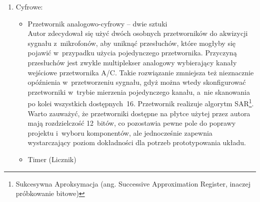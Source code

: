 \begin{enumerate}
\begin{itemize}
\begin{figure}[h!]
			\caption{Użyty w~projekcie głośnik.\\ Źródło: https://botland.com.pl/49567-thickbox\_default/glosnik-mg15-01w-8ohm-15x4mm.jpg}
			\label{fig:mg15}
		\end{figure}
		\item Filtr dolnoprzepustowy (antyaliasingowy) -- dwie sztuki\\
		Zanim sygnał zostanie dostarczony do przetwornika A/C, należy zapewnić, by jego częstotliwość nie przekroczyła częstotliwości Nyquista\footnote{Jest to połowa częstotliwości próbkowania sygnału. Przekroczenie jej przez nieodfiltrowany sygnał powoduje pokrycie się dwóch, różnych od siebie sygnałów. Przykład aliasingu: Dla częstotliwości Nyquista równej \SI{1000}{\Hz}, nieodfiltrowany sygnał \SI{3100}{\Hz} zostałby odczytany jako sygnał \SI{100}{\Hz}.}. Pozwala to uniknąć błędnego zakodowania sygnału w~dziedzinie cyfrowej.
	\end{itemize}
	\item Cyfrowe:
	\begin{itemize}
		\item Przetwornik analogowo-cyfrowy -- dwie sztuki\\
		Autor zdecydował się użyć dwóch osobnych przetworników do akwizycji sygnału z~mikrofonów, aby uniknąć przesłuchów, które mogłyby się pojawić w~przypadku użycia pojedynczego przetwornika. Przyczyną przesłuchów jest zwykle multiplekser analogowy wybierający kanały wejściowe przetwornika A/C. Takie rozwiązanie zmniejsza też nieznacznie opóźnienia w~przetworzeniu sygnału, gdyż można wtedy skonfigurować przetworniki w~trybie mierzenia pojedynczego kanału, a~nie skanowania po kolei wszystkich dostępnych~16. Przetwornik realizuje algorytm SAR\footnote{Sukcesywna Aproksymacja (ang. Successive Approximation Register, inaczej próbkowanie bitowe)}.\\
		Warto zauważyć, że przetworniki dostępne na płytce użytej przez autora mają rozdzielczość 12~bitów, co pozostawia pewne pole do poprawy projektu i~wyboru komponentów, ale jednocześnie zapewnia wystarczający poziom dokładności dla potrzeb prototypowania układu.
		\item Timer (Licznik)\\

\end{itemize}
\end{enumerate}
